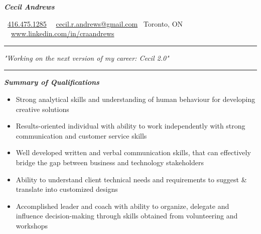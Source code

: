 \documentclass{article}
\begin{document}
\begin{center}
   
\Huge \textcolor{ablue}{\textit{\textbf{Cecil Andrews}}}

\end{center}

\begin{center}
 
\faPhone \  \href{  tel:+1 416.475.1285}{416.475.1285} \textbar  \ \faEnvelope \  \href{mailto:cecil.r.andrews@gmail.com}{cecil.r.andrews@gmail.com}  \textbar  \ Toronto, ON \faCanadianmapleleaf  \textbar  \  \faLinkedin \ \href{http://www.linkedin.com/in/craandrews}{www.linkedin.com/in/craandrews}

\end{center}


\noindent
{\color{ablue} \rule{\linewidth}{0.5mm} }
\begin{center}
\setmainfont{Arial}
\textcolor{ablue}{\LARGE \textit{"Working on the next version of my career: Cecil 2.0"}}
\end{center}
\textnormal
\noindent
{\color{ablue} \rule{\linewidth}{0.5mm} }

\begin{center}
\large \textcolor{ablue}{\textit{\textbf{Summary of Qualifications}}}
\end{center}

\begin{flushleft}
\begin{itemize}
\item Strong analytical skills and understanding of human behaviour for developing creative solutions\\
\item Results-oriented individual with ability to work independently with strong communication and customer service skills \\
\item Well developed written and verbal communication skills, that can effectively bridge the gap between business and technology stakeholders \\
\item Ability to understand client technical needs and requirements to suggest \& translate into customized designs\\
\item Accomplished leader and  coach with ability to organize, delegate and influence decision-making through skills obtained from volunteering and workshops
\end{itemize}
\end{flushleft}
\end{document}
